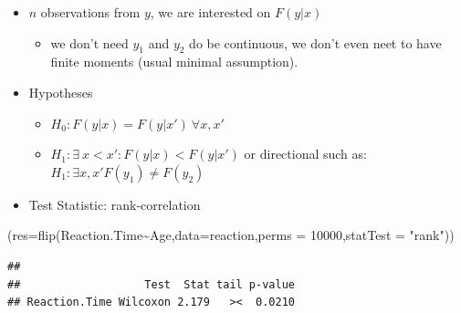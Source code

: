 \documentclass[
]{article}
\newenvironment{Shaded}{\begin{snugshade}}{\end{snugshade}}
\newcommand{\AttributeTok}[1]{\textcolor[rgb]{0.77,0.63,0.00}{#1}}
\newcommand{\CommentTok}[1]{\textcolor[rgb]{0.56,0.35,0.01}{\textit{#1}}}
\newcommand{\DecValTok}[1]{\textcolor[rgb]{0.00,0.00,0.81}{#1}}
\newcommand{\FunctionTok}[1]{\textcolor[rgb]{0.00,0.00,0.00}{#1}}
\newcommand{\NormalTok}[1]{#1}
\newcommand{\SpecialCharTok}[1]{\textcolor[rgb]{0.00,0.00,0.00}{#1}}
\newcommand{\StringTok}[1]{\textcolor[rgb]{0.31,0.60,0.02}{#1}}
\providecommand{\tightlist}{%
  \setlength{\itemsep}{0pt}\setlength{\parskip}{0pt}}
\begin{document}
\begin{itemize}
\tightlist
\item
  \(n\) observations from \(y\), we are interested on \(F(y|x)\)

  \begin{itemize}
  \tightlist
  \item
    we don't need \(y_1\) and \(y_2\) do be continuous, we don't even
    neet to have finite moments (usual minimal assumption).
  \end{itemize}
\item
  Hypotheses

  \begin{itemize}
  \tightlist
  \item
    \(H_0: F(y|x)=F(y|x')\ \forall x,x'\)\\
  \item
    \(H_1: \exists \ x< x' : F(y|x)< F(y|x')\) or directional such as:
    \(H_1: \exists x,x' F(y_1)\neq F(y_2)\)
  \end{itemize}
\item
  Test Statistic: rank-correlation
\end{itemize}

\begin{Shaded}
\begin{Highlighting}[]
\NormalTok{(}\AttributeTok{res=}\FunctionTok{flip}\NormalTok{(Reaction.Time}\SpecialCharTok{\textasciitilde{}}\NormalTok{Age,}\AttributeTok{data=}\NormalTok{reaction,}\AttributeTok{perms =} \DecValTok{10000}\NormalTok{,}\AttributeTok{statTest  =} \StringTok{"rank"}\NormalTok{))}
\end{Highlighting}
\end{Shaded}

\begin{verbatim}
## 
##                   Test  Stat tail p-value
## Reaction.Time Wilcoxon 2.179   ><  0.0210
\end{verbatim}

\begin{Shaded}
\end{Shaded}
\end{document}
